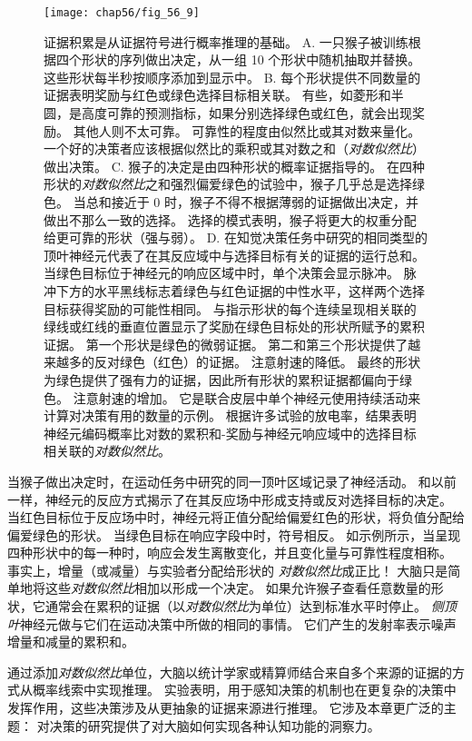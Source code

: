 \begin{figure}[htbp]
	\centering
	\texttt{[image: chap56/fig\_56\_9]}
	\caption{证据积累是从证据符号进行概率推理的基础。
		A. 一只猴子被训练根据四个形状的序列做出决定，从一组 10 个形状中随机抽取并替换。
		这些形状每半秒按顺序添加到显示中。
		B. 每个形状提供不同数量的证据表明奖励与红色或绿色选择目标相关联。
		有些，如菱形和半圆，是高度可靠的预测指标，如果分别选择绿色或红色，就会出现奖励。
		其他人则不太可靠。 可靠性的程度由似然比或其对数来量化。
		一个好的决策者应该根据似然比的乘积或其对数之和（\textit{对数似然比}）做出决策。
		C. 猴子的决定是由四种形状的概率证据指导的。
		在四种形状的\textit{对数似然比}之和强烈偏爱绿色的试验中，猴子几乎总是选择绿色。
		当总和接近于 0 时，猴子不得不根据薄弱的证据做出决定，并做出不那么一致的选择。
		选择的模式表明，猴子将更大的权重分配给更可靠的形状（强与弱）。
		D. 在知觉决策任务中研究的相同类型的顶叶神经元代表了在其反应域中与选择目标有关的证据的运行总和。
		当绿色目标位于神经元的响应区域中时，单个决策会显示脉冲。
		脉冲下方的水平黑线标志着绿色与红色证据的中性水平，这样两个选择目标获得奖励的可能性相同。
		与指示形状的每个连续呈现相关联的绿线或红线的垂直位置显示了奖励在绿色目标处的形状所赋予的累积证据。
		第一个形状是绿色的微弱证据。
		第二和第三个形状提供了越来越多的反对绿色（红色）的证据。 注意射速的降低。
		最终的形状为绿色提供了强有力的证据，因此所有形状的累积证据都偏向于绿色。
		注意射速的增加。
		它是联合皮层中单个神经元使用持续活动来计算对决策有用的数量的示例。
		根据许多试验的放电率，结果表明神经元编码概率比对数的累积和-奖励与神经元响应域中的选择目标相关联的\textit{对数似然比}\cite{yang2007probabilistic}。}
	\label{fig:56_9}
\end{figure}


当猴子做出决定时，在运动任务中研究的同一顶叶区域记录了神经活动。
和以前一样，神经元的反应方式揭示了在其反应场中形成支持或反对选择目标的决定。
当红色目标位于反应场中时，神经元将正值分配给偏爱红色的形状，将负值分配给偏爱绿色的形状。
当绿色目标在响应字段中时，符号相反。
如示例所示，当呈现四种形状中的每一种时，响应会发生离散变化，并且变化量与可靠性程度相称。
事实上，增量（或减量）与实验者分配给形状的 \textit{对数似然比}成正比！
大脑只是简单地将这些\textit{对数似然比}相加以形成一个决定。
如果允许猴子查看任意数量的形状，它通常会在累积的证据（以\textit{对数似然比}为单位）达到标准水平时停止。
\textit{侧顶叶}神经元做与它们在运动决策中所做的相同的事情。
它们产生的发射率表示噪声增量和减量的累积和。


通过添加\textit{对数似然比}单位，大脑以统计学家或精算师结合来自多个来源的证据的方式从概率线索中实现推理。
实验表明，用于感知决策的机制也在更复杂的决策中发挥作用，这些决策涉及从更抽象的证据来源进行推理。
它涉及本章更广泛的主题：
对决策的研究提供了对大脑如何实现各种认知功能的洞察力。



